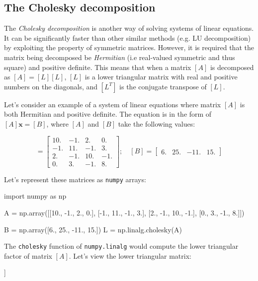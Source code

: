 \subsection{The Cholesky decomposition}
\label{sec:cholesky}

The \emph{Cholesky decomposition} is another way of solving systems of linear equations. It can be significantly faster than other similar methods (e.g. LU decomposition) by exploiting the property of symmetric matrices. However, it is required that the matrix being decomposed be \emph{Hermitian} (i.e real-valued symmetric and thus square) and positive definite. This means that when a matrix $[A]$ is decomposed as $[A] = [L][L]$, $[L]$ is a lower triangular matrix with real and positive numbers on the diagonals, and $[L^T]$ is the conjugate transpose of $[L]$.

Let's consider an example of a system of linear equations where matrix $[A]$ is both Hermitian and positive definite. The equation is in the form of $[A]\boldsymbol{x} = [B]$, where $[A]$ and $[B]$ take the following values:

\begin{equation*}
[A] = \begin{bmatrix}
10.& -1.& 2.& 0.\\ 
-1.& 11.& -1.& 3.\\ 
2.& -1.& 10.& -1.\\
0.& 3.& -1.& 8.
\end{bmatrix};\quad
[B] = \begin{bmatrix}
	6.& 25.& -11.& 15.
\end{bmatrix}
\end{equation*}

Let's represent these matrices as \texttt{numpy} arrays:

\begin{ipythonnon}
import numpy as np

A = np.array([[10., -1., 2., 0.], 
              [-1., 11., -1., 3.], 
              [2., -1., 10., -1.],
              [0., 3., -1., 8.]]) 

B = np.array([6., 25., -11., 15.])
L = np.linalg.cholesky(A)
\end{ipythonnon}

The \texttt{cholesky} function of \texttt{numpy.linalg} would compute the lower triangular factor of matrix $[A]$. Let's view the lower triangular matrix:

\begin{ipythonnon}
print (L}
\end{ipythonnon}
\begin{ioutput}
[[ 3.16227766  0.         0.         0.        ]
 [-0.31622777  3.3015148  0.         0.        ] 
 [ 0.63245553 -0.24231301 3.08889696 0.        ] 
 [ 0.          0.9086738 -0.25245792 2.6665665 ]]
\end{ioutput}

